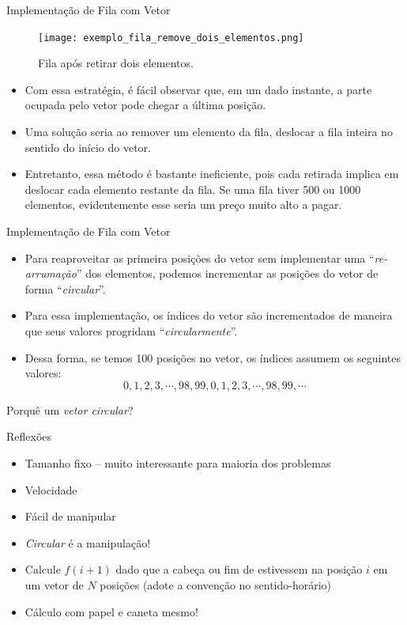 \begin{frame}{Implementação de Fila com Vetor}	
	\begin{figure}[ht]
				\centering
				\texttt{[image: exemplo\_fila\_remove\_dois\_elementos.png]}
				\caption{Fila após retirar dois elementos.}	
	\end{figure} 	
	\begin{itemize}
		\item Com essa estratégia, é fácil observar que, em um dado instante, a parte 
		ocupada pelo vetor pode chegar a última posição.
		\item Uma solução seria ao remover um elemento da fila, deslocar a fila inteira 
		no sentido do início do vetor.
		\item Entretanto, essa método é bastante ineficiente, pois cada retirada implica 
		em deslocar cada elemento restante da fila. Se uma fila tiver 500 ou 1000 elementos, 
		evidentemente esse seria um preço muito alto a pagar.		
	\end{itemize}
\end{frame}

\begin{frame}{Implementação de Fila com Vetor}		
	\begin{itemize}		
		\item Para reaproveitar as primeira posições do vetor sem implementar uma ``\textit{re-arrumação}'' dos elementos, podemos incrementar as posições do vetor de forma ``\textit{circular}''.
		\item Para essa implementação, os índices do vetor são incrementados de maneira que seus valores progridam ``\textit{circularmente}''. 
		\item Dessa forma, se temos 100 posições no vetor, os índices assumem os seguintes valores:
		$$0, 1, 2, 3, \cdots, 98, 99, 0, 1, 2, 3, \cdots, 98, 99, \cdots$$
	\end{itemize}
\end{frame}




\begin{frame}{Porquê um \textit{vetor circular}?}

\begin{block}{Reflexões}
  \begin{itemize}
    \item Tamanho fixo -- muito interessante para maioria dos problemas
    \item Velocidade
    \item Fácil de manipular
    \item \textit{Circular} é a manipulação!
    \item Calcule $f(i+1)$ dado que a cabeça ou fim de estivessem
    na posição $i$ em um vetor de $N$ posições (adote a convenção no sentido-horário)
    \item Cálculo com papel e caneta mesmo!
    
    
  \end{itemize}
\end{block}

\end{frame}


